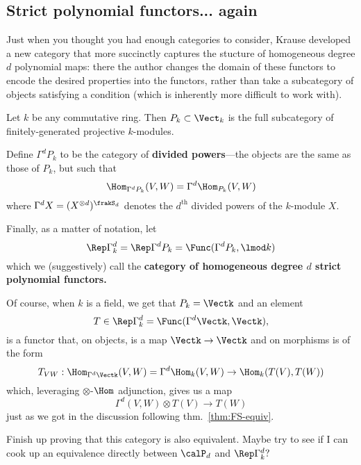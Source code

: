 \documentclass[12pt]{article}
\begin{document}
\subsection{Strict polynomial functors... again}
Just when you thought you had enough categories to consider, Krause developed a new category that more succinctly captures
the stucture of homogeneous degree $d$ polynomial maps: there the author changes the domain of these functors 
to encode the desired properties into the functors, rather than take a subcategory of objects satisfying a condition (which 
is inherently more difficult to work with).
\begin{defn}\label{defn:div-powers}
	Let $k$ be any commutative ring. Then $P_k\subset \Vect_k$ is the full subcategory of finitely-generated projective $k$-modules.

	Define $\Gamma^d P_k$ to be the category of \textbf{divided powers}---the objects are the same as those of $P_k$, but such that 
	\[\Hom_{\Gamma^dP_k}(V,W)=\Gamma^d\Hom_{P_k}(V,W)\]
	where $\Gamma^d X=(X^{\otimes d})^{\frakS_d}$ denotes the \textbf{$d^{\text{th}}$} divided powers of the $k$-module $X$.

	Finally, as a matter of notation, let 
	\[\Rep\Gamma^d_k=\Rep\Gamma^dP_k=\Func(\Gamma^dP_k,\lmod k)\]
	which we (suggestively) call the \textbf{category of homogeneous degree $d$ strict polynomial functors.}
\end{defn}
\begin{rmk}
	Of course, when $k$ is a field, we get that $P_k=\Vectk$ and an element
	\[T\in\Rep\Gamma^d_k=\Func(\Gamma^d\Vectk,\Vectk),\]
	is a functor that, on objects, is a map $\Vectk\to \Vectk$ and on morphisms is of the form 
	\[T_{VW}:\Hom_{\Gamma^d\Vectk}(V,W)=\Gamma^d\Hom_k(V,W)\to \Hom_k(T(V),T(W))\]
	which, leveraging $\otimes$-$\Hom$ adjunction, gives us a map 
	\[\Gamma^d(V,W)\otimes T(V)\to T(W)\]
	just as we got in the discussion following thm.~\ref{thm:FS-equiv}.
\end{rmk}

{\color{red} Finish up proving that this category is also equivalent. Maybe try to see if I can cook up an equivalence directly between $\calP_d$ and $\Rep\Gamma^d_k?$}
\end{document}
